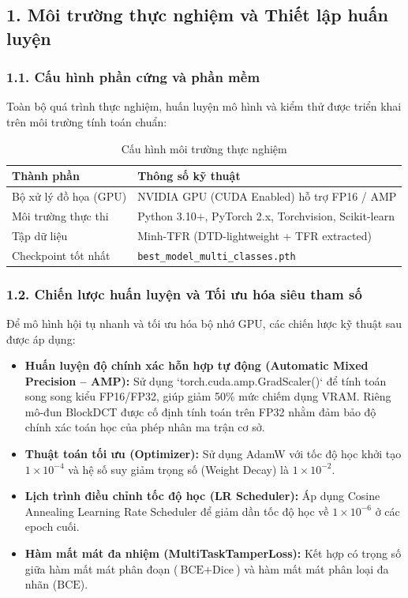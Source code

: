 \subsection{1. Môi trường thực nghiệm và Thiết lập huấn luyện}

\subsubsection{1.1. Cấu hình phần cứng và phần mềm}
\indent\indent Toàn bộ quá trình thực nghiệm, huấn luyện mô hình và kiểm thử được triển khai trên môi trường tính toán chuẩn:
\begin{table}[H]
    \centering
    \caption{Cấu hình môi trường thực nghiệm}
    \label{tab:env_specs}
    \vspace{0.2cm}
    \renewcommand{\arraystretch}{1.3}
    \begin{tabular}{|m{4.5cm}|m{9.5cm}|}
        \hline
        \textbf{Thành phần} & \textbf{Thông số kỹ thuật} \\
        \hline
        Bộ xử lý đồ họa (GPU) & NVIDIA GPU (CUDA Enabled) hỗ trợ FP16 / AMP \\
        \hline
        Môi trường thực thi & Python 3.10+, PyTorch 2.x, Torchvision, Scikit-learn \\
        \hline
        Tập dữ liệu & Minh-TFR (DTD-lightweight + TFR extracted) \\
        \hline
        Checkpoint tốt nhất & \texttt{best\_model\_multi\_classes.pth} \\
        \hline
    \end{tabular}
\end{table}

\subsubsection{1.2. Chiến lược huấn luyện và Tối ưu hóa siêu tham số}
\indent\indent Để mô hình hội tụ nhanh và tối ưu hóa bộ nhớ GPU, các chiến lược kỹ thuật sau được áp dụng:
\begin{itemize}[label={--}, itemsep=2pt]
    \item \textbf{Huấn luyện độ chính xác hỗn hợp tự động (Automatic Mixed Precision -- AMP):} Sử dụng `torch.cuda.amp.GradScaler()` để tính toán song song kiểu FP16/FP32, giúp giảm 50\% mức chiếm dụng VRAM. Riêng mô-đun BlockDCT được cố định tính toán trên FP32 nhằm đảm bảo độ chính xác toán học của phép nhân ma trận cơ sở.
    \item \textbf{Thuật toán tối ưu (Optimizer):} Sử dụng AdamW với tốc độ học khởi tạo $1 \times 10^{-4}$ và hệ số suy giảm trọng số (Weight Decay) là $1 \times 10^{-2}$.
    \item \textbf{Lịch trình điều chỉnh tốc độ học (LR Scheduler):} Áp dụng Cosine Annealing Learning Rate Scheduler để giảm dần tốc độ học về $1 \times 10^{-6}$ ở các epoch cuối.
    \item \textbf{Hàm mất mát đa nhiệm (MultiTaskTamperLoss):} Kết hợp có trọng số giữa hàm mất mát phân đoạn ($\text{BCE} + \text{Dice}$) và hàm mất mát phân loại đa nhãn ($\text{BCE}$).
\end{itemize}
